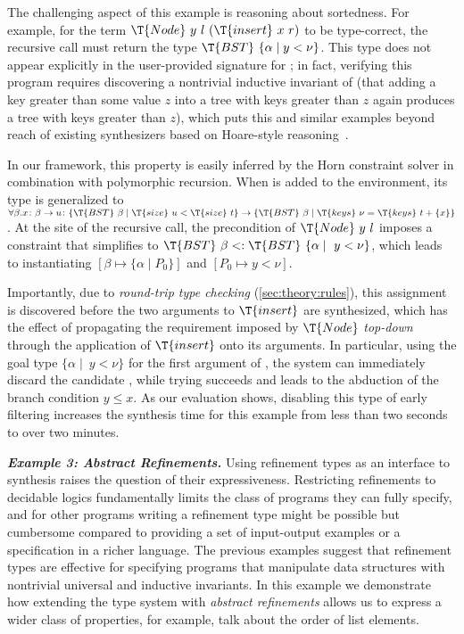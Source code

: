 \documentclass[10pt,preprint]{sigplanconf-pldi16}
\theoremstyle{definition}
\newcommand{\custompar}[1]{\parskip 0pt \textbf{\textit{#1}}}
\newcommand{\Subt}{<:}
\begin{document}
The challenging aspect of this example is reasoning about sortedness.
For example, for the term $\T{Node}\ y\ l\ (\T{insert}\ x\ r)$ to be type-correct,
the recursive call must return the type $\T{BST}\ \{\alpha\mid y < \nu\}$.
This type does not appear explicitly in the user-provided signature for ;
in fact, verifying this program requires discovering a nontrivial inductive invariant of 
(that adding a key greater than some value $z$ into a tree with keys greater than $z$ again produces a tree with keys greater than $z$),
which puts this and similar examples beyond reach of existing synthesizers based on Hoare-style reasoning~\cite{LeinoMi12,KneussKuKuSu13}.

In our framework, this property is easily inferred by the Horn constraint solver in combination with polymorphic recursion.
When  is added to the environment, 
its type is generalized to $\forall \beta . x\colon\beta \to u\colon \{\T{BST}\ \beta\mid \T{size}\ u < \T{size}\ t \} \to \{\T{BST}\ \beta\mid\T{keys}\ \nu = \T{keys}\ t + \{x\}\}$.
At the site of the recursive call, the precondition of $\T{Node}\ y\ l$ imposes a constraint that simplifies to $\T{BST}\ \beta\Subt \T{BST}\ \{\alpha\mid\ y < \nu\}$,
which leads to instantiating $[\beta\mapsto\{\alpha\mid P_0\}]$ and $[P_0\mapsto y < \nu]$.

Importantly, due to \emph{round-trip type checking} (\autoref{sec:theory:rules}), 
this assignment is discovered before the two arguments to $\T{insert}$ are synthesized,
which has the effect of propagating the requirement imposed by $\T{Node}$ \emph{top-down} through the application of $\T{insert}$ onto its arguments.
In particular, using the goal type $\{\alpha\mid\ y < \nu\}$ for the first argument of ,
the system can immediately discard the candidate ,
while trying  succeeds and leads to the abduction of the branch condition $y \leq x$.
As our evaluation shows, disabling this type of early filtering increases the synthesis time for this example from less than two seconds to over two minutes.

\custompar{Example 3: Abstract Refinements.}
Using refinement types as an interface to synthesis raises the question of their expressiveness.
Restricting refinements to decidable logics fundamentally limits the class of programs they can fully specify,
and for other programs writing a refinement type might be possible but cumbersome compared to providing a set of input-output examples or a specification in a richer language.
The previous examples suggest that refinement types are effective for specifying programs that manipulate data structures
with nontrivial universal and inductive invariants.
In this example we demonstrate how extending the type system with \emph{abstract refinements} allows us to express a wider class of properties,
for example, talk about the order of list elements.
\end{document}
